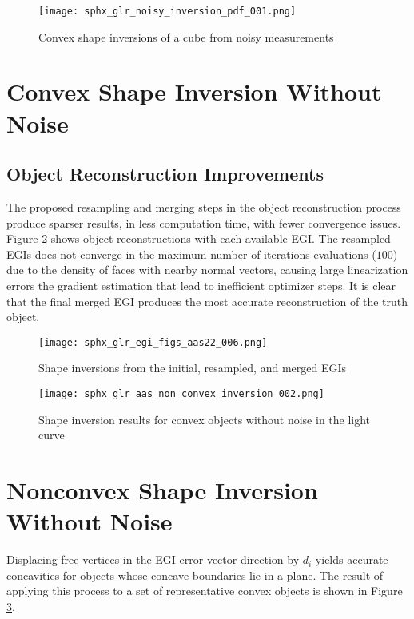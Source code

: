 \begin{figure}[!htb]
  \centering
  \texttt{[image: sphx\_glr\_noisy\_inversion\_pdf\_001.png]}
  \caption{Convex shape inversions of a cube from noisy measurements}
  \label{fig:noisy_convex_inversions}
\end{figure}

\clearpage
\section{Convex Shape Inversion Without Noise}

\subsection{Object Reconstruction Improvements}

The proposed resampling and merging steps in the object reconstruction process produce sparser results, in less computation time, with fewer convergence issues. Figure \ref{fig:egi_reconstructions} shows object reconstructions with each available EGI. The resampled EGIs does not converge in the maximum number of iterations evaluations ($100$) due to the density of faces with nearby normal vectors, causing large linearization errors the gradient estimation that lead to inefficient optimizer steps. It is clear that the final merged EGI produces the most accurate reconstruction of the truth object.

\begin{figure}[!htb]
  \centering
  \texttt{[image: sphx\_glr\_egi\_figs\_aas22\_006.png]}
  \caption{Shape inversions from the initial, resampled, and merged EGIs}
  \label{fig:egi_reconstructions}
\end{figure}

\begin{figure}[!htb]
  \centering
  \texttt{[image: sphx\_glr\_aas\_non\_convex\_inversion\_002.png]}
  \caption{Shape inversion results for convex objects without noise in the light curve}
  \label{fig:res_convex_no_noise}
\end{figure}

\clearpage
\section{Nonconvex Shape Inversion Without Noise}

Displacing free vertices in the EGI error vector direction by $d_i$ yields accurate concavities for objects whose concave boundaries lie in a plane. The result of applying this process to a set of representative convex objects is shown in Figure \ref{fig:res_convex_no_noise}.

